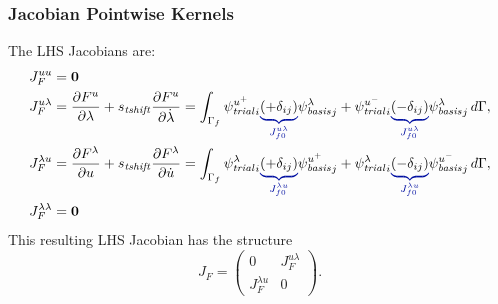 \subsubsection{Jacobian Pointwise Kernels}

The LHS Jacobians are:
\begin{align}
  J_F^{uu} &= \tensor{0} \\
  J_F^{u\lambda} &= \frac{\partial F^u}{\partial \lambda} + s_\mathit{tshift} \frac{\partial F^u}{\partial \dot{\lambda}} =
                    \int_{\Gamma_{f}} \trialscalar[u^+]_i \eqnannotate{\left(+\delta_{ij}\right)}{J^{u\lambda}_{f0}} \basisscalar[\lambda]_j
                     + \trialscalar[u^-]_i \eqnannotate{\left(-\delta_{ij}\right)}{J^{u\lambda}_{f0}} \basisscalar[\lambda]_j\, d\Gamma, \\
  J_F^{\lambda u} &= \frac{\partial F^\lambda}{\partial u} + s_\mathit{tshift} \frac{\partial F^\lambda}{\partial \dot{u}} =
                    \int_{\Gamma_{f}} \trialscalar[\lambda]_i 
                    \eqnannotate{\left(+\delta_{ij}\right)}{J^{\lambda u}_{f0}} \basisscalar[u^+]_j
                    + \trialscalar[\lambda]_i \eqnannotate{\left(-\delta_{ij}\right)}{J^{\lambda u}_{f0}} \basisscalar[u^-]_j \, d\Gamma, \\
  J_F^{\lambda \lambda} &= \tensor{0}
\end{align}
This resulting LHS Jacobian has the structure
\begin{equation}
  J_F = \left( \begin{array} {cc} 0 & J_F^{u\lambda} \\ J_F^{\lambda u} & 0 \end{array} \right).
\end{equation}

